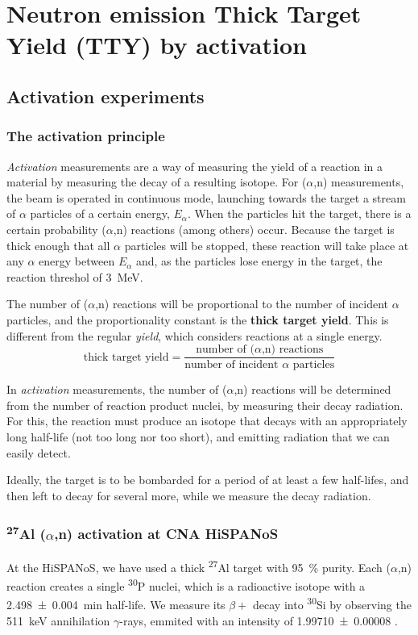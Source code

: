 \documentclass[a4paper,12pt]{report}
\newcommand{\an}{($\alpha$,n) }
\newcommand{\Aliso}{\textsuperscript{27}Al }
\newcommand{\Piso}{\textsuperscript{30}P }
\begin{document}

\chapter{Neutron emission Thick Target Yield (TTY) by activation}

\section{Activation experiments}

\subsection{The activation principle}
\textit{Activation} measurements are a way of measuring the yield of a reaction in a material by measuring the decay of a resulting isotope.
For \an measurements, the beam is operated in continuous mode, launching towards the target a stream of $\alpha$ particles of a certain energy, $E_\alpha$.
When the particles hit the target, there is a certain probability \an reactions (among others) occur.
Because the target is thick enough that all $\alpha$ particles will be stopped, these reaction will take place at any $\alpha$ energy between $E_\alpha$ and, as the particles lose energy in the target, the reaction threshol of \qty{3}{\MeV}.

The number of \an reactions will be proportional to the number of incident $\alpha$ particles, and the proportionality constant is the \textbf{thick target yield}.
This is different from the regular \textit{yield}, which considers reactions at a single energy.
\begin{equation}
	\text{thick target yield} = \frac{\text{number of \an reactions}}{\text{number of incident $\alpha$ particles}}
	\label{tty_def}
\end{equation}

In \textit{activation} measurements, the number of \an reactions will be determined from the number of reaction product nuclei, by measuring their decay radiation.
For this, the reaction must produce an isotope that decays with an appropriately long half-life (not too long nor too short), and emitting radiation that we can easily detect.

Ideally, the target is to be bombarded for a period of at least a few half-lifes, and then left to decay for several more, while we measure the decay radiation.

\subsection{\Aliso\an activation at CNA HiSPANoS}
At the HiSPANoS, we have used a thick \Aliso target with \qty{95}{\percent} purity.
Each \an reaction creates a single \Piso nuclei, which is a radioactive isotope with a \qty{2.498(4)}{\minute} half-life.
We measure its $\beta +$ decay into \textsuperscript{30}Si by observing the \qty{511}{\keV} annihilation $\gamma$-rays, emmited with an intensity of \num{1.99710(8)} \cite{nucleardatasheets}.
\end{document}
